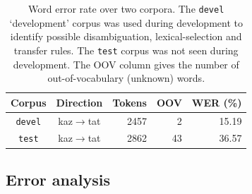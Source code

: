 \documentclass[11pt]{article}
\newenvironment{itemise}[1]{
        \begin{itemize}\setlength{\itemsep}{-0.3em}
        \vspace{-0.6em}
        #1
}{
        \end{itemize}
        \vspace{-1pt}
}
\begin{document}

\begin{table}
  \begin{center}
  \begin{tabular}{ccrrr}
  \toprule
   Corpus                 & Direction           & Tokens  & OOV & WER (\%) \\
  \midrule
  \texttt{devel} & kaz$\rightarrow$tat & 2457    & 2       & 15.19 \\
  \bottomrule
  \texttt{test} & kaz$\rightarrow$tat & 2862    & 43      & 36.57 \\
  \end{tabular}
    \caption{Word error rate over two corpora. The \texttt{devel} `development' corpus was used during development 
       to identify possible disambiguation, lexical-selection and transfer rules. The \texttt{test} corpus
       was not seen during development. The OOV column gives the number of out-of-vocabulary (unknown) words.}
    \label{table:wer-development}
  \end{center}
\end{table}



\subsection{Error analysis}

\end{document}
